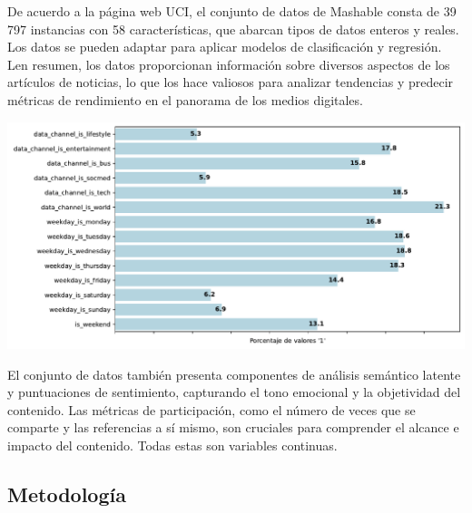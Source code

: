 \documentclass[
  number,
  preprint,
  3p,
  twocolumn]{elsarticle}
\begin{document}
De acuerdo a la página web UCI, el conjunto de datos de Mashable consta
de 39 797 instancias con 58 características, que abarcan tipos de datos
enteros y reales. Los datos se pueden adaptar para aplicar modelos de
clasificación y regresión. Len resumen, los datos proporcionan
información sobre diversos aspectos de los artículos de noticias, lo que
los hace valiosos para analizar tendencias y predecir métricas de
rendimiento en el panorama de los medios digitales.

\includegraphics{Articulo_v2_files/figure-pdf/cell-4-output-1.pdf}

El conjunto de datos también presenta componentes de análisis semántico
latente y puntuaciones de sentimiento, capturando el tono emocional y la
objetividad del contenido. Las métricas de participación, como el número
de veces que se comparte y las referencias a sí mismo, son cruciales
para comprender el alcance e impacto del contenido. Todas estas son
variables continuas.

\subsection{Metodología}\label{metodologuxeda}
\end{document}
